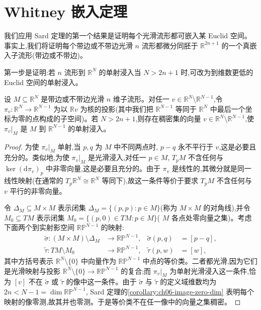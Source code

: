 \documentclass[../../main.tex]{subfiles}
\begin{document}
\section{Whitney 嵌入定理}\label{section:ch06-Whitney嵌入定理}

我们应用 Sard 定理的第一个结果是证明每个光滑流形都可嵌入某 Euclid 空间。事实上,我们将证明每个带边或不带边光滑 $n$ 流形都微分同胚于 $\mathbb{R}^{2n+1}$ 的一个真嵌入子流形(带边或不带边)。

第一步是证明:若 $n$ 流形到 $\mathbb{R}^N$ 的单射浸入当 $N>2n+1$ 时,可改为到维数更低的 Euclid 空间的单射浸入。

\begin{lemma}\label{lemma:ch06-reduce-codimension}
设 $M\subseteq\mathbb{R}^N$ 是带边或不带边光滑 $n$ 维子流形。对任一 $v\in\mathbb{R}^N\setminus\mathbb{R}^{N-1}$,令 $\pi_v:\mathbb{R}^N\to\mathbb{R}^{N-1}$ 为以 $\mathbb{R}v$ 为核的投影(其中我们把 $\mathbb{R}^{N-1}$ 等同于 $\mathbb{R}^N$ 中最后一个坐标为零的点构成的子空间)。若 $N>2n+1$,则存在稠密集的向量 $v\in\mathbb{R}^N\setminus\mathbb{R}^{N-1}$,使 $\pi_v|_M$ 是 $M$ 到 $\mathbb{R}^{N-1}$ 的单射浸入。
\end{lemma}

\begin{proof}
为使 $\pi_v|_M$ 单射,当 $p,q$ 为 $M$ 中不同两点时, $p-q$ 永不平行于 $v$,这是必要且充分的。类似地,为使 $\pi_v|_M$ 是光滑浸入,对任一 $p\in M$, $T_pM$ 不含任何与 $\ker(\mathrm{d}\pi_v)_p$ 中非零向量,这是必要且充分的。由于 $\pi_v$ 是线性的,其微分就是同一线性映射(在通常的 $T_p\mathbb{R}^N\cong\mathbb{R}^N$ 等同下),故这一条件等价于要求 $T_pM$ 不含任何与 $v$ 平行的非零向量。

令 $\Delta_M\subseteq M\times M$ 表示闭集 $\Delta_M=\{(p,p):p\in M\}$(称为 $M\times M$ 的对角线),并令 $M_0\subseteq TM$ 表示闭集 $M_0=\{(p,0)\in TM:p\in M\}$( $M$ 各点处零向量之集)。考虑下面两个到实射影空间 $\mathbb{RP}^{N-1}$ 的映射:
\begin{align*}
\widetilde{\sigma}:(M\times M)\setminus\Delta_M&\to\mathbb{RP}^{N-1},&
\widetilde{\sigma}(p,q)&=[p-q],\\
\widetilde{\tau}:TM\setminus M_0&\to\mathbb{RP}^{N-1},&
\widetilde{\tau}(p,w)&=[w],
\end{align*}
其中方括号表示 $\mathbb{R}^N\setminus\{0\}$ 中向量作为 $\mathbb{RP}^{N-1}$ 中点的等价类。二者都光滑,因为它们是光滑映射与投影 $\mathbb{R}^N\setminus\{0\}\to\mathbb{RP}^{N-1}$ 的复合;而 $\pi_v|_M$ 为单射光滑浸入这一条件,恰为 $[v]$ 不在 $\widetilde{\sigma}$ 或 $\widetilde{\tau}$ 的像中这一条件。由于 $\widetilde{\sigma}$ 与 $\widetilde{\tau}$ 的定义域维数均为 $2n<N-1=\dim\mathbb{RP}^{N-1}$, Sard 定理的\cref{corollary:ch06-image-zero-dim} 表明每个映射的像零测,故其并也零测。于是等价类不在任一像中的向量之集稠密。
\end{proof}
\end{document}
